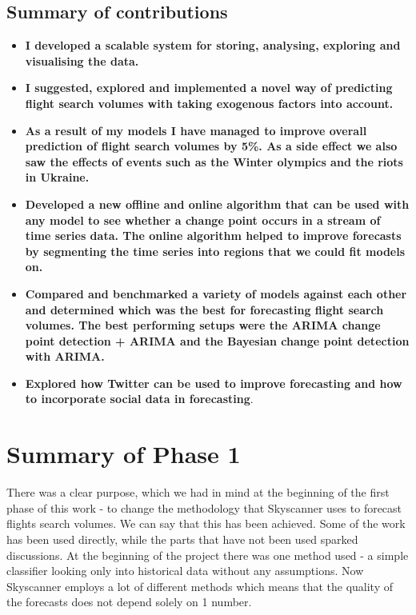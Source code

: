 \documentclass[minf,twoside,singlespacing,parskip,frontabs,notimes,12pt]{infthesis} %
\begin{document}
\newpage
\section{Summary of contributions}

\begin{itemize}
\item \textbf{I developed a scalable system for storing, analysing, exploring and visualising the data.}
\item \textbf{I suggested, explored and implemented a novel way of predicting flight search volumes with taking exogenous factors into account.}
\item \textbf{As a result of my models I have managed to improve overall prediction of flight search volumes by 5\%. As a side effect we also saw the effects of events such as the Winter olympics and the riots in Ukraine.} 
\item \textbf{Developed a new offline and online algorithm that can be used with any model to see whether a change point occurs in a stream of time series data. The online algorithm helped to improve forecasts by segmenting the time series into regions that we could fit models on.} 
\item \textbf{Compared and benchmarked a variety of models against each other and determined which was the best for forecasting flight search volumes. The best performing setups were the ARIMA change point detection + ARIMA and the Bayesian change point detection with ARIMA.}
\item \textbf{Explored how Twitter can be used to improve forecasting and how to incorporate social data in forecasting}.
\end{itemize}



\chapter{Summary of Phase 1}

There was a clear purpose, which we had in mind at the beginning of the first phase of this work - to change the methodology that Skyscanner uses to forecast flights search volumes. We can say that this has been achieved. Some of the work has been used directly, while the parts that have not been used sparked discussions. At the beginning of the project there was one method used - a simple classifier looking only into historical data without any assumptions. Now Skyscanner employs a lot of different methods which means that the quality of the forecasts does not depend solely on 1 number. 
\end{document}
